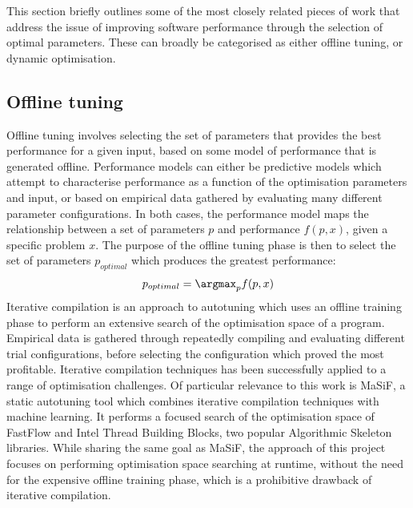 This section briefly outlines some of the most closely related pieces
of work that address the issue of improving software performance
through the selection of optimal parameters. These can broadly be
categorised as either offline tuning, or dynamic optimisation.

\subsection{Offline tuning}\label{subsec:offline-tuning}
Offline tuning involves selecting the set of parameters that provides
the best performance for a given input, based on some model of
performance that is generated offline. Performance models can either
be predictive models which attempt to characterise performance as a
function of the optimisation parameters and input, or based on
empirical data gathered by evaluating many different parameter
configurations. In both cases, the performance model maps the
relationship between a set of parameters $p$ and performance $f(p,x)$,
given a specific problem $x$. The purpose of the offline tuning phase
is then to select the set of parameters $p_{optimal}$ which produces
the greatest performance:
\begin{align*}
  p_{optimal} = \argmax_{p}f(p,x)
\end{align*}
Iterative compilation is an approach to autotuning which uses an
offline training phase to perform an extensive search of the
optimisation space of a program.  Empirical data is gathered through
repeatedly compiling and evaluating different trial configurations,
before selecting the configuration which proved the most
profitable. Iterative compilation techniques has been successfully
applied to a range of optimisation challenges. Of particular relevance
to this work is MaSiF, a static autotuning tool which combines
iterative compilation techniques with machine learning.  It performs a
focused search of the optimisation space of FastFlow and Intel Thread
Building Blocks, two popular Algorithmic Skeleton libraries. While
sharing the same goal as MaSiF, the approach of this project focuses
on performing optimisation space searching at runtime, without the
need for the expensive offline training phase, which is a prohibitive
drawback of iterative compilation.

~\cite{Fursin2010}

